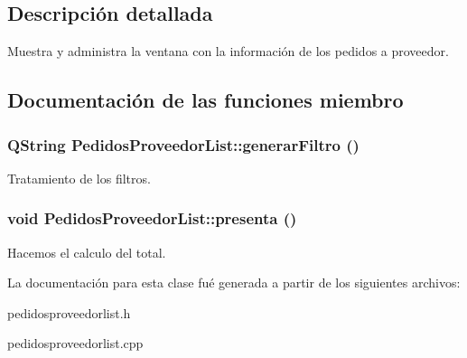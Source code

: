 \subsection{Descripci\'{o}n detallada}
Muestra y administra la ventana con la informaci\'{o}n de los pedidos a proveedor. 



\subsection{Documentaci\'{o}n de las funciones miembro}
\subsubsection{\setlength{\rightskip}{0pt plus 5cm}QString Pedidos\-Proveedor\-List::generar\-Filtro ()}\label{classPedidosProveedorList_a1}


Tratamiento de los filtros. 
\subsubsection{\setlength{\rightskip}{0pt plus 5cm}void Pedidos\-Proveedor\-List::presenta ()}\label{classPedidosProveedorList_a11}


Hacemos el calculo del total. 

La documentaci\'{o}n para esta clase fu\'{e} generada a partir de los siguientes archivos:\begin{CompactItemize}
\item 
pedidosproveedorlist.h\item 
pedidosproveedorlist.cpp\end{CompactItemize}
